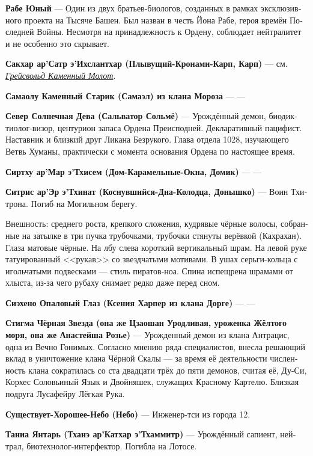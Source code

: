 \documentclass[a4paper,12pt,fleqn]{book}\usepackage{cooltooltips}\usepackage{polyglossia}\setdefaultlanguage[babelshorthands=true]{russian}\setotherlanguage{english}\defaultfontfeatures{Ligatures=TeX,Mapping=tex-text} \usepackage{xcolor}\definecolor{lightgray}{HTML}{bbbbbb}\color{lightgray}\newcommand{\ml}[3]{\textenglish{\textcolor{black}{#3}}}
\newcommand{\theterm}[3]{\textbf{\hypertarget{#1}{#2}} --- #3}
\newcommand{\thesynonim}[3]{\textbf{#2} --- см. \textit{\hyperlink{#1}{#3}}.}
\begin{document}
{\theterm{rabe} %
{Рабе Юный}
{Один из двух братьев-биологов, созданных в рамках эксклюзивного проекта на Тысяче Башен.
Был назван в честь Йона Рабе, героя времён Последней Войны.
Несмотря на принадлежность к Ордену, соблюдает нейтралитет и не особенно это скрывает.}

\thesynonim{grejsvolt}
{Сакхар ар’Сатр э’Ихслантхар (Плывущий-Кронами-Карп, Карп)}
{Грейсвольд Каменный Молот}

\theterm{samajolu}
{Самаолу Каменный Старик (Самаэл) из клана Мороза}
{---}

\theterm{sevjer} %
{Север Солнечная Дева (Сальватор Сольмё)}
{Урождённый демон, биодиктиолог-визор, центурион запаса Ордена Преисподней.
Декларативный пацифист.
Наставник и близкий друг Ликана Безрукого.
Глава отдела 1028, изучающего Ветвь Хуманы, практически с момента основания Ордена по настоящее время.}

\theterm{sirtchu-lechoe}
{Сиртху ар'Мар э'Тхисем (Дом-Карамельные-Окна, Домик)}
{---}

\theterm{sitris}
{Ситрис ар’Эр э’Тхинат (Коснувшийся-Дна-Колодца, Донышко)}
{Воин Тхитрона.
Погиб на Могильном берегу.

Внешность: среднего роста, крепкого сложения, кудрявые чёрные волосы, собранные на затылке в три пучка трубочками, трубочки стянуты верёвкой (Кахрахан).
Глаза матовые чёрные.
На лбу слева короткий вертикальный шрам.
На левой руке татуированный <<рукав>> со звездчатыми мотивами.
В ушах серьги-кольца с игольчатыми подвесками --- стиль пиратов-ноа.
Спина испещрена шрамами от хлыста, из-за чего рубаху снимает редко даже перед сном.}

\theterm{siejeno} %
{Сиэхено Опаловый Глаз (Ксения Харпер из клана Дорге)}
{---}

\theterm{stijma} %
{Стигма Чёрная Звезда (она же Цзаошан Уродливая, уроженка Жёлтого моря, она же Анастейша Розье)}
{Урожденный демон из клана Антрацис, одна из Вечно Гонимых.
Согласно мнению ряда специалистов, внесла решающий вклад в уничтожение клана Чёрной Скалы --- за время её деятельности численность клана сократилась со ста двадцати трёх до пяти демонов, считая её, Ду-Си, Корхес Соловьиный Язык и Двойняшек, служащих Красному Картелю.
Близкая подруга Лусафейру Лёгкая Рука.}

\theterm{sky} %
{Существует-Хорошее-Небо (Небо)}
{Инженер-тси из города 12.}

\theterm{chhanei}
{Таниа Янтарь (Тханэ ар’Катхар э’Тхаммитр)}
{Урождённый сапиент, нейтрал, биотехнолог-интерфектор.
Погибла на Лотосе.

}}
\end{document}

